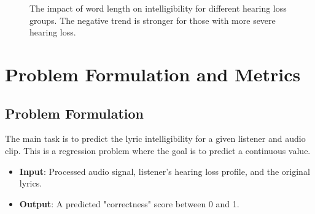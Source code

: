 \documentclass[conference]{IEEEtran}
\begin{document}
\begin{figure}[t!]
    \centering
    \hfill
    \hfill
    \caption{The impact of word length on intelligibility for different hearing loss groups. The negative trend is stronger for those with more severe hearing loss.}
    \label{fig:synthesis}
\end{figure}

\section{Problem Formulation and Metrics}
\subsection{Problem Formulation}
The main task is to predict the lyric intelligibility for a given listener and audio clip. This is a regression problem where the goal is to predict a continuous value.
\begin{itemize}
    \item \textbf{Input}: Processed audio signal, listener's hearing loss profile, and the original lyrics.
    \item \textbf{Output}: A predicted "correctness" score between 0 and 1.
\end{itemize}
\end{document}
